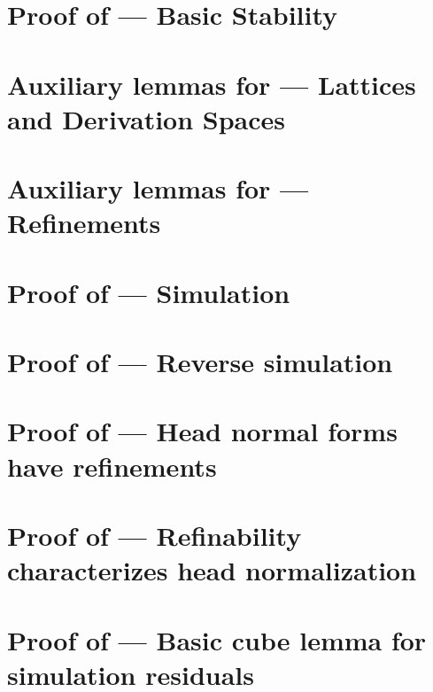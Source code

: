 \section{Proof of  --- Basic Stability}
\label{basic_stability_proof}


\section{Auxiliary lemmas for  --- Lattices and Derivation Spaces}
\label{lemmas_lattices_and_derivation_spaces_proof}


\section{Auxiliary lemmas for  --- Refinements}
\label{refinements_proof}


\section{Proof of  --- Simulation}
\label{simulation_proof}


\section{Proof of  --- Reverse simulation}
\label{reverse_simulation_proof}


\section{Proof of  --- Head normal forms have refinements}
\label{hnf_has_refinement_proof}


\section{Proof of  --- Refinability characterizes head normalization}
\label{has_hnf_has_refinement_proof}


\section{Proof of  --- Basic cube lemma for simulation residuals}
\label{cube_lemma_for_simulation_residuals_proof}


